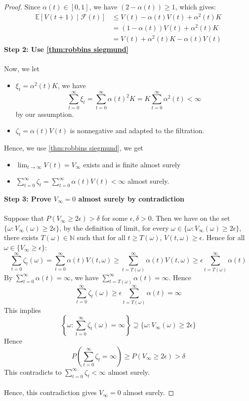 \begin{proof}
\noindent Since $\alpha(t) \in [0,1]$, we have $(2 - \alpha(t)) \geq 1$, which gives:
\begin{align*}
\mathbb{E}[V(t+1) \mid \mathcal{F}(t)] &\leq V(t) - \alpha(t)V(t) + \alpha^2(t)K \\
&= (1 - \alpha(t))V(t) + \alpha^2(t)K\\
&= V(t) + \alpha^2(t) K -\alpha(t) V(t)
\end{align*}
\textbf{Step 2: Use \autoref{thm:robbins siegmund}}\\
\\
\noindent Now, we let
\begin{itemize}
    \item $\xi_t = \alpha^2(t)K$, we have 
    $$
    \sum_{t=0}^\infty \xi_t  = \sum_{t=0}^\infty \alpha(t)^2K = K\sum_{t=0}^\infty \alpha^2(t) <\infty
    $$
    by our assumption. 
    \item $\zeta_t = \alpha(t)V(t)$ is nonnegative and adapted to the filtration. 
\end{itemize}
Hence, we use \autoref{thm:robbins siegmund}, we get
\begin{itemize}
    \item $\lim_{t\to\infty} V(t) = V_\infty$ exists and is finite almost surely
    \item $\sum_{t=0}^\infty \zeta_t = \sum_{t=0}^\infty \alpha(t) V(t)<\infty$ almost surely.
\end{itemize}
\textbf{Step 3: Prove $V_\infty =0$ almost surely by contradiction}\\
\\
Suppose that $P(V_\infty\ge 2\epsilon)>\delta$ for some $\epsilon, \delta>0$. Then we have on the set $\{\omega: V_\infty(\omega)\ge 2\epsilon\}$, by the definition of limit, for every $\omega\in \{\omega: V_\infty(\omega)\ge 2\epsilon\}$, there exists $T(\omega)\in\mathbb{N}$ such that for all $t\ge T(\omega)$, $V(t,\omega)\ge \epsilon$. Hence for all $\omega\in\{V_\infty\ge \epsilon\}$:
$$
\sum_{t=0}^\infty \zeta_t(\omega) = \sum_{t=0}^\infty \alpha(t)V(t,\omega)\ge \sum_{t=T(\omega)}^\infty \alpha(t) V(t,\omega)\ge \epsilon\sum_{t=T(\omega)}^\infty \alpha (t)
$$
By $\sum_{t=0}^\infty \alpha (t) = \infty$, we have $\sum_{t=T(\omega)}^\infty \alpha(t) = \infty$. Hence
$$
\sum_{t=0}^\infty \zeta_t(\omega) \ge \epsilon\sum_{t=T(\omega)}^\infty \alpha (t) = \infty
$$
This implies 
$$
\left\{\omega: \sum_{t=0}^\infty \zeta_t(\omega)=\infty\right\}\supseteq \{\omega: V_\infty(\omega)\ge 2\epsilon\}
$$
Hence
$$
P\left(\sum_{t=0}^\infty \zeta_t =  \infty\right) \ge P\left(V_\infty \ge 2\epsilon\right)>\delta
$$
This contradicts to $\sum_{t=0}^\infty \zeta_t<\infty$ almost surely.\\
\\
Hence, this contradiction gives $V_\infty =0$ almost surely.
\end{proof}
\newpage

